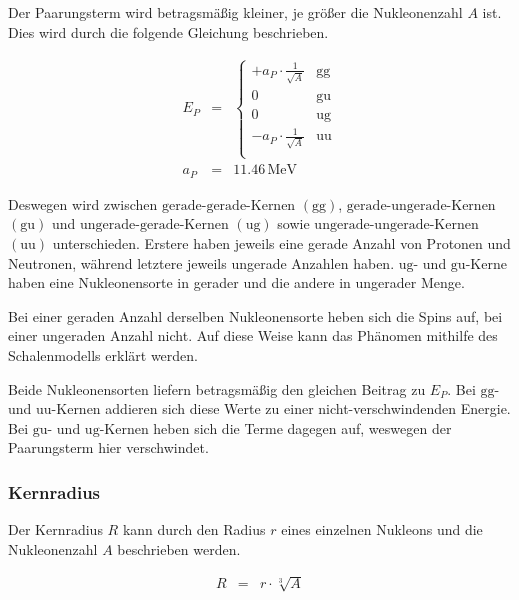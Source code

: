 \documentclass[12pt,a4paper]{scrartcl}
\numberwithin{equation}{section} %
\renewcommand{\[}{} %
\renewcommand{\]}{\noindent} %
\begin{document}
Der Paarungsterm wird betragsmäßig kleiner, je größer die Nukleonenzahl
\(A\) ist. Dies wird durch die folgende Gleichung beschrieben.

\[
\begin{eqnarray}
        E_P &=&
                \begin{cases}
                        + a_P\cdot \frac{1}{\sqrt{A}} & \text{gg} \\
                        0 & \text{gu} \\
                        0 & \text{ug} \\
                        - a_P\cdot \frac{1}{\sqrt{A}} & \text{uu} \\
                \end{cases} \\
        a_P &=& 11.46\mathrm{\,MeV}
\end{eqnarray}
\]

Deswegen wird zwischen \(\mathrm{gerade}\)-\(\mathrm{gerade}\)-Kernen
\((\mathrm{gg})\), \(\mathrm{gerade}\)-\(\mathrm{ungerade}\)-Kernen
\((\mathrm{gu})\) und \(\mathrm{ungerade}\)-\(\mathrm{gerade}\)-Kernen
\((\mathrm{ug})\) sowie
\(\mathrm{ungerade}\)-\(\mathrm{ungerade}\)-Kernen \((\mathrm{uu})\)
unterschieden. Erstere haben jeweils eine gerade Anzahl von Protonen und
Neutronen, während letztere jeweils ungerade Anzahlen haben.
\(\mathrm{ug}\)- und \(\mathrm{gu}\)-Kerne haben eine Nukleonensorte in
gerader und die andere in ungerader Menge.

Bei einer geraden Anzahl derselben Nukleonensorte heben sich die Spins
auf, bei einer ungeraden Anzahl nicht. Auf diese Weise kann das Phänomen
mithilfe des Schalenmodells erklärt werden.

Beide Nukleonensorten liefern betragsmäßig den gleichen Beitrag zu
\(E_P\). Bei \(\mathrm{gg}\)- und \(\mathrm{uu}\)-Kernen addieren sich
diese Werte zu einer nicht-verschwindenden Energie. Bei \(\mathrm{gu}\)-
und \(\mathrm{ug}\)-Kernen heben sich die Terme dagegen auf, weswegen
der Paarungsterm hier verschwindet.

\hypertarget{kernradius}{%
\subsubsection{Kernradius}\label{kernradius}}

Der Kernradius \(R\) kann durch den Radius \(r\) eines einzelnen
Nukleons und die Nukleonenzahl \(A\) beschrieben werden.

\[
\begin{eqnarray}
        R &=& r \cdot \sqrt[3]{A}
\end{eqnarray}
\]
\end{document}
